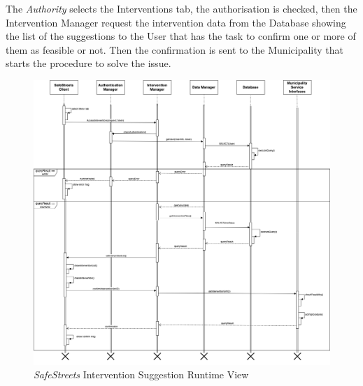 \documentclass{article}
\begin{document}
	The {\it Authority} selects the Interventions tab, the authorisation is checked, then the Intervention Manager request the intervention data from the Database showing the list of the suggestions to the User that has the task to confirm one or more of them as feasible or not. Then the confirmation is sent to the Municipality that starts the procedure to solve the issue.  
	\begin{figure}[H]
			\centering
			\includegraphics[scale=0.30]{Images/Diagrams/Runtime/interventions_runtime.png}
			\caption{{\it SafeStreets} Intervention Suggestion Runtime View}
	\end{figure}
	\pagebreak
	\noindent
\end{document}
